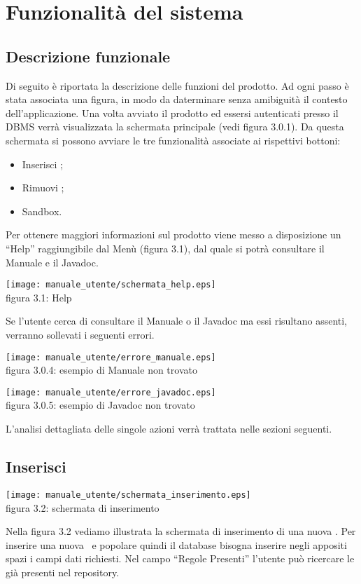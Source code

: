 \chapter{Funzionalit\`a del sistema}
\section{Descrizione funzionale}
Di seguito \`e riportata la descrizione delle funzioni del prodotto. Ad ogni passo \`e stata associata una figura, in modo da daterminare senza amibiguit\`a il contesto dell'applicazione. Una volta avviato il prodotto ed essersi autenticati presso il DBMS verr\`a visualizzata la schermata principale (vedi figura 3.0.1).
Da questa schermata si possono avviare le tre funzionalit\`a associate ai rispettivi bottoni:
\begin{itemize}
\item Inserisci \br;
\item Rimuovi \br;
\item Sandbox.
\end{itemize}
Per ottenere maggiori informazioni sul prodotto viene messo a disposizione un ``Help'' raggiungibile dal Men\`u (figura 3.1), dal quale si potr\`a consultare il Manuale e il Javadoc.
\begin{center}
\texttt{[image: manuale\_utente/schermata\_help.eps]}\\
 figura 3.1: Help
\end{center}
Se l'utente cerca di consultare il Manuale o il Javadoc ma essi risultano assenti, verranno sollevati i seguenti errori.
\begin{center}
\texttt{[image: manuale\_utente/errore\_manuale.eps]}\\
figura 3.0.4: esempio di Manuale non trovato
\end{center}
\begin{center}
\texttt{[image: manuale\_utente/errore\_javadoc.eps]}\\
figura 3.0.5: esempio di Javadoc non trovato
\end{center}
L'analisi dettagliata delle singole azioni verr\`a trattata nelle sezioni seguenti.
\section{Inserisci \br}
\begin{center}
\texttt{[image: manuale\_utente/schermata\_inserimento.eps]}\\
 figura 3.2: schermata di inserimento
\end{center}
Nella figura 3.2 vediamo illustrata la schermata di inserimento di una nuova \br. Per inserire una nuova \br\ e popolare quindi il database bisogna inserire negli appositi spazi i campi dati richiesti.
Nel campo ``Regole Presenti'' l'utente pu\`o ricercare le \br gi\`a presenti nel repository.
